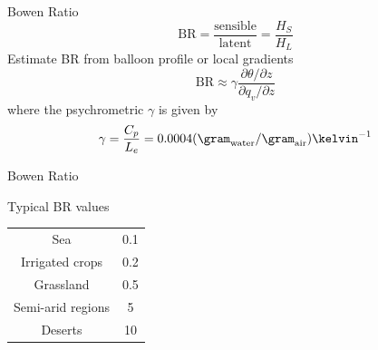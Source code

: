 \begin{frame}{Bowen Ratio}
$$\mathrm{BR} = \frac{\text{sensible}}{\text{latent}} = \frac{H_S}{H_L}$$
Estimate BR from balloon profile or local gradients
$$\mathrm{BR} \approx \gamma \frac{\partial \theta / \partial z}{\partial q_v / \partial z}$$
where the psychrometric $\gamma$ is given by
$$\gamma = \frac{C_p}{L_e} = 0.0004 (\gram_{\text{water}}/\gram_{\text{air}}) \kelvin^{-1}$$
\end{frame}

\begin{frame}{Bowen Ratio}
\begin{center}
Typical BR values\\
\begin{tabular}{ c c }
\hline
 Sea & 0.1 \\ 
 Irrigated crops & 0.2 \\  
 Grassland & 0.5  \\
 Semi-arid regions & 5\\
 Deserts & 10
\end{tabular}
\end{center}
\end{frame}





